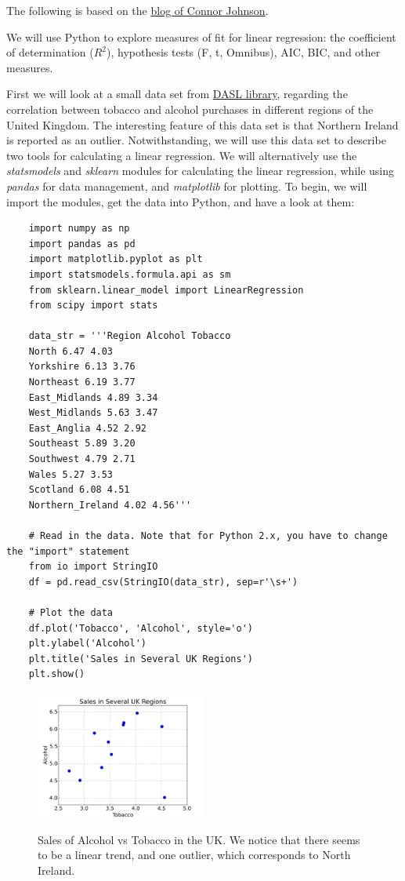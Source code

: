 The following is based on the \href{http://connor-johnson.com/2014/02/18/linear-regression-with-python/}{blog of Connor Johnson}.

We will use Python to explore measures of fit for linear regression: the coefficient of determination ($R^2$), hypothesis tests (F, t, Omnibus), AIC, BIC, and other measures.

First we will look at a small data set from \href{http://lib.stat.cmu.edu/DASL/Stories/AlcoholandTobacco.html}{DASL library}, regarding the correlation between tobacco and alcohol purchases in different regions of the United Kingdom. The interesting feature of this data set is that Northern Ireland is reported as an outlier. Notwithstanding, we will use this data set to describe two tools for calculating a linear regression. We will alternatively use the \emph{statsmodels} and \emph{sklearn} modules for calculating the linear regression, while using \emph{pandas} for data management, and \emph{matplotlib} for plotting. To begin, we will import the modules, get the data into Python, and have a look at them:

\begin{lstlisting}
    import numpy as np
    import pandas as pd
    import matplotlib.pyplot as plt
    import statsmodels.formula.api as sm
    from sklearn.linear_model import LinearRegression
    from scipy import stats

    data_str = '''Region Alcohol Tobacco
    North 6.47 4.03
    Yorkshire 6.13 3.76
    Northeast 6.19 3.77
    East_Midlands 4.89 3.34
    West_Midlands 5.63 3.47
    East_Anglia 4.52 2.92
    Southeast 5.89 3.20
    Southwest 4.79 2.71
    Wales 5.27 3.53
    Scotland 6.08 4.51
    Northern_Ireland 4.02 4.56'''

    # Read in the data. Note that for Python 2.x, you have to change the "import" statement
    from io import StringIO
    df = pd.read_csv(StringIO(data_str), sep=r'\s+')

    # Plot the data
    df.plot('Tobacco', 'Alcohol', style='o')
    plt.ylabel('Alcohol')
    plt.title('Sales in Several UK Regions')
    plt.show()
\end{lstlisting}

\begin{figure}
  \centering
  \includegraphics[width=0.5\textwidth]{../Images/Alc_vs_Tobacco.png}\\
  \caption{Sales of Alcohol vs Tobacco in the UK. We notice that there seems to be a linear trend, and one outlier, which corresponds to North Ireland.}
\end{figure}


